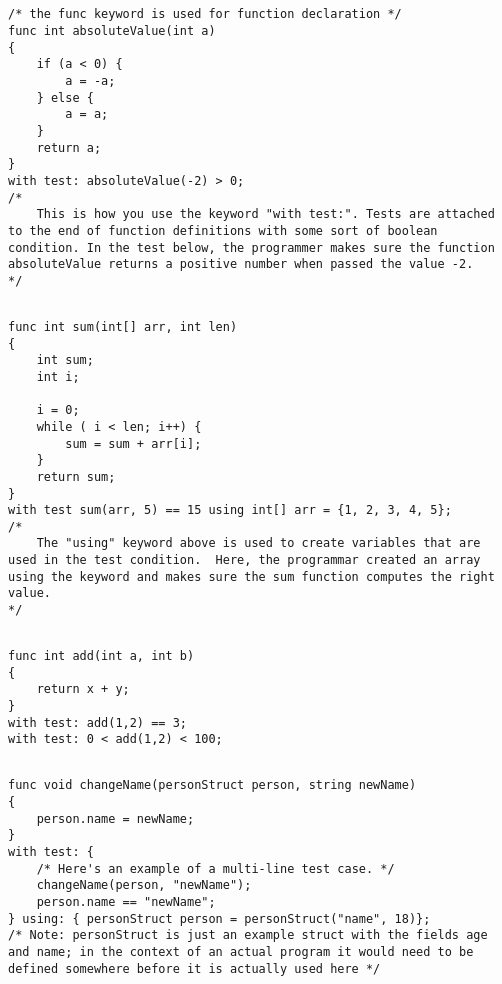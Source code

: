 \documentclass{article}
\begin{document}
\subsection{}
\begin{lstlisting}
/* the func keyword is used for function declaration */
func int absoluteValue(int a)
{
	if (a < 0) {
		a = -a;
	} else {
		a = a;
	}
	return a;
}
with test: absoluteValue(-2) > 0;
/*
	This is how you use the keyword "with test:". Tests are attached to the end of function definitions with some sort of boolean condition. In the test below, the programmer makes sure the function absoluteValue returns a positive number when passed the value -2.
*/
\end{lstlisting}


\subsection{}
\begin{lstlisting}
func int sum(int[] arr, int len)
{
	int sum;
	int i;
	
	i = 0;
	while ( i < len; i++) {
		sum = sum + arr[i];
	}
	return sum;
}
with test sum(arr, 5) == 15 using int[] arr = {1, 2, 3, 4, 5};
/*
	The "using" keyword above is used to create variables that are used in the test condition.  Here, the programmar created an array using the keyword and makes sure the sum function computes the right value.
*/
\end{lstlisting}


\subsection{}
\begin{lstlisting}
func int add(int a, int b)
{
	return x + y;
}
with test: add(1,2) == 3;
with test: 0 < add(1,2) < 100;
\end{lstlisting}


\subsection{}
\begin{lstlisting}
func void changeName(personStruct person, string newName)
{
	person.name = newName;
}
with test: {
	/* Here's an example of a multi-line test case. */
	changeName(person, "newName");
	person.name == "newName";
} using: { personStruct person = personStruct("name", 18)};
/* Note: personStruct is just an example struct with the fields age and name; in the context of an actual program it would need to be defined somewhere before it is actually used here */
\end{lstlisting}
\end{document}
